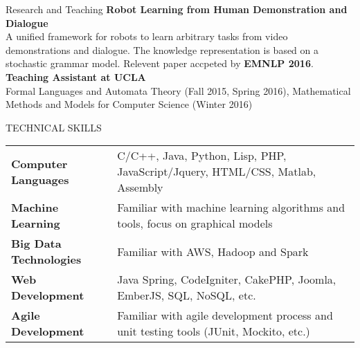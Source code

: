 \documentclass{resume} %
\begin{document}

\begin{rSection}{Research and Teaching}
\textbf{Robot Learning from Human Demonstration and Dialogue}\\
A unified framework for robots to learn arbitrary tasks from video demonstrations and dialogue. The knowledge representation is based on a stochastic grammar model. Relevent paper accpeted by \textbf{EMNLP 2016}.\\
\textbf{Teaching Assistant at UCLA}\\  
Formal Languages and Automata Theory (Fall 2015, Spring 2016), Mathematical Methods and Models for Computer Science (Winter 2016)
\end{rSection}



\begin{rSection}{TECHNICAL SKILLS}

\begin{tabular}{ @{} >{\bfseries}l @{\hspace{6ex}} l }
Computer Languages & C/C++, Java, Python, Lisp, PHP, JavaScript/Jquery, HTML/CSS, Matlab, Assembly \\
Machine Learning & Familiar with machine learning algorithms and tools, focus on graphical models \\
Big Data Technologies & Familiar with AWS, Hadoop and Spark \\
Web Development & Java Spring, CodeIgniter, CakePHP, Joomla, EmberJS, SQL, NoSQL, etc. \\
Agile Development & Familiar with agile development process and unit testing tools (JUnit, Mockito, etc.) \\
\end{tabular}
\end {rSection}


\end{document}
